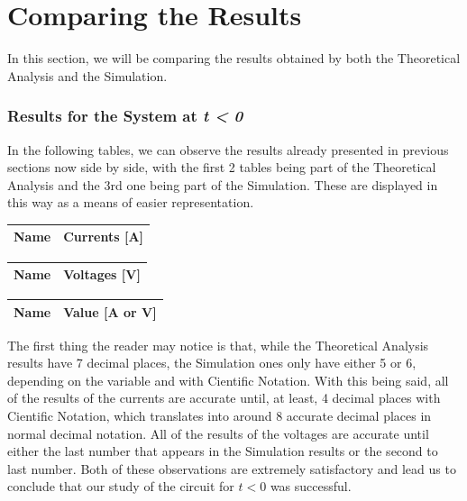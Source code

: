 \clearpage

\section{Comparing the Results}
\label{sec:comparing}

In this section, we will be comparing the results obtained by both the Theoretical Analysis and the Simulation.

\subsubsection{Results for the System at \textit{t < 0}}

In the following tables, we can observe the results already presented in previous sections now side by side, with the first
2 tables being part of the Theoretical Analysis and the 3rd one being part of the Simulation. These are displayed in this
way as a means of easier representation.

\begin{tabular}{|l|r|}
    \hline    
    {\bf Name} & {\bf Currents [A]} \\ \hline
    
\end{tabular}
\quad
\begin{tabular}{|l|r|}
    \hline    
    {\bf Name} & {\bf Voltages [V]} \\ \hline
    
\end{tabular}
\quad
\begin{tabular}{|l|r|}
    \hline    
    {\bf Name} & {\bf Value [A or V]} \\ \hline
    
\end{tabular}

The first thing the reader may notice is that, while the Theoretical Analysis results have 7 decimal places, the Simulation ones only have either 5 or 6, depending on the variable and with Cientific Notation. With this being said, all of the results of the currents are accurate until, at least, 4 decimal places with Cientific Notation, which translates into around 8 accurate decimal places in normal decimal notation. All of the results of the voltages are accurate until either the last number that appears in the Simulation results or the second to last number. Both of these observations are extremely satisfactory and lead us to conclude that our study of the circuit for $t < 0$ was successful.

